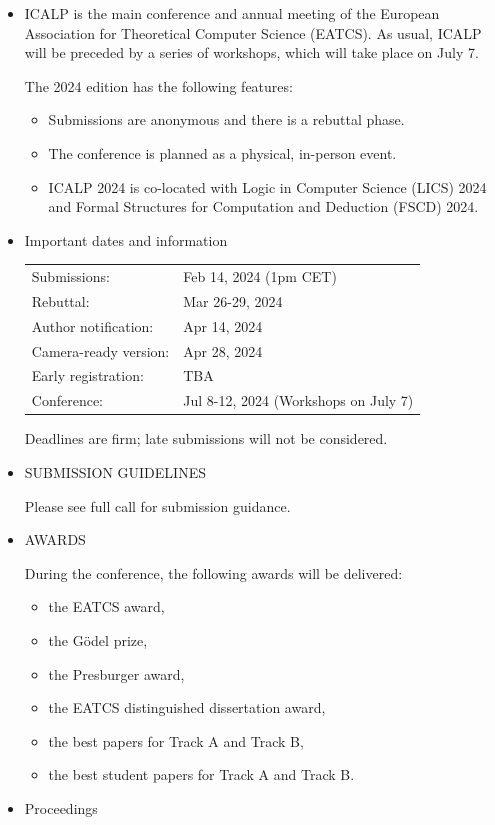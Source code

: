 \documentclass[prodmode,acmtecs]{acmsmall} %
\begin{document}
\begin{itemize}\item  ICALP is the main conference and annual meeting of the European Association for Theoretical Computer Science (EATCS). As usual, ICALP will be preceded by a series of workshops, which will take place on July 7. 
 
  The 2024 edition has the following features: 
 
\begin{itemize}\item  Submissions are anonymous and there is a rebuttal phase.
\item  The conference is planned as a physical, in-person event.
\item  ICALP 2024 is co-located with Logic in Computer Science (LICS) 2024 and  Formal Structures for Computation and Deduction (FSCD) 2024.
\end{itemize} 
\item  Important dates and information 
 
\begin{tabulary}{\linewidth}{LL}Submissions:  & Feb 14, 2024 (1pm CET) \\
Rebuttal:  & Mar 26-29, 2024 \\
Author notification:  & Apr 14, 2024 \\
Camera-ready version:  & Apr 28, 2024 \\
Early registration:  & TBA \\
Conference:  & Jul 8-12, 2024 (Workshops on July 7) \\
\end{tabulary}
 
  Deadlines are firm; late submissions will not be considered. 
 
\item  SUBMISSION GUIDELINES 
 
  Please see full call for submission guidance. 
 
\item  AWARDS 
 
  During the conference, the following awards will be delivered: 
 
\begin{itemize}\item  the EATCS award,
\item  the Gödel prize,
\item  the Presburger award,
\item  the EATCS distinguished dissertation award,
\item  the best papers for Track A and Track B,
\item  the best student papers for Track A and Track B.
\end{itemize} 
\item  Proceedings 
 

\end{itemize}
\end{document}
